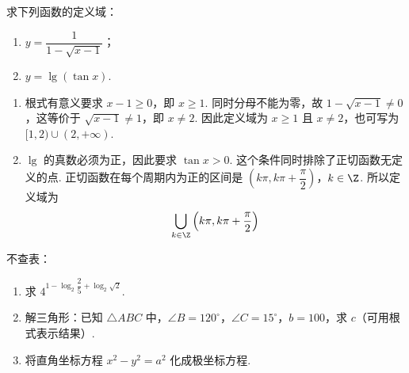 \begin{problem}
求下列函数的定义域：

\begin{enumerate}
\item \(y=\dfrac1{1-\sqrt{x-1}}\)；
\item \(y=\lg\left(\tan x\right)\).
\end{enumerate}
\end{problem}

\begin{solution}
\begin{enumerate}
\item 根式有意义要求 \(x-1\geqslant0\)，即 \(x\geqslant1\). 同时分母不能为零，故 \(1-\sqrt{x-1}\ne0\)，这等价于 \(\sqrt{x-1}\ne1\)，即 \(x\ne2\). 因此定义域为 \(x\geqslant1\) 且 \(x\ne2\)，也可写为 \([1,2)\cup(2,+\infty)\).

\item \(\lg\) 的真数必须为正，因此要求 \(\tan x>0\). 这个条件同时排除了正切函数无定义的点. 正切函数在每个周期内为正的区间是
\(\left(k\pi,k\pi+\dfrac\pi2\right)\)，\(k\in\Z\).
所以定义域为
\[
\bigcup_{k\in\Z}\left(k\pi,k\pi+\dfrac\pi2\right)
\]
\end{enumerate}
\end{solution}

\begin{problem}
不查表：

\begin{enumerate}
\item 求 \(4^{1-\log_2\dfrac25+\log_2\sqrt2}\).
\item 解三角形：已知 \(\triangle ABC\) 中，\(\angle B=120^\circ\)，\(\angle C=15^\circ\)，\(b=100\)，求 \(c\)（可用根式表示结果）.
\item 将直角坐标方程 \(x^2-y^2=a^2\) 化成极坐标方程.
\end{enumerate}
\end{problem}

